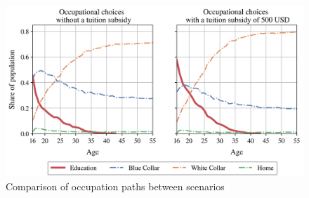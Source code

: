 \begin{figure}[H]
	\caption{Comparison of occupation paths between scenarios}
	\centering
	\includegraphics[scale=0.75]{../figures/occ_paths}
\end{figure}

